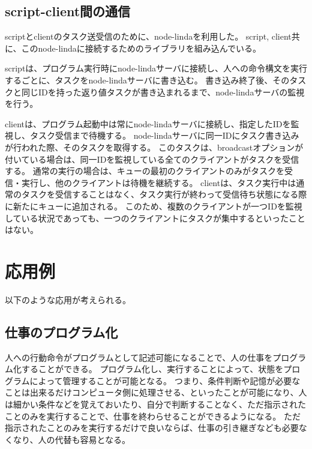 \subsection{script-client間の通信}\label{script-clientux9593ux306eux901aux4fe1}

scriptとclientのタスク送受信のために、node-linda\cite{linda}を利用した。
script,
client共に、このnode-lindaに接続するためのライブラリを組み込んでいる。

scriptは、プログラム実行時にnode-lindaサーバに接続し、人への命令構文を実行するごとに、タスクをnode-lindaサーバに書き込む。
書き込み終了後、そのタスクと同じIDを持った返り値タスクが書き込まれるまで、node-lindaサーバの監視を行う。

clientは、プログラム起動中は常にnode-lindaサーバに接続し、指定したIDを監視し、タスク受信まで待機する。
node-lindaサーバに同一IDにタスク書き込みが行われた際、そのタスクを取得する。
このタスクは、broadcastオプションが付いている場合は、同一IDを監視している全てのクライアントがタスクを受信する。
通常の実行の場合は、キューの最初のクライアントのみがタスクを受信・実行し、他のクライアントは待機を継続する。
clientは、タスク実行中は通常のタスクを受信することはなく、タスク実行が終わって受信待ち状態になる際に新たにキューに追加される。
このため、複数のクライアントが一つIDを監視している状況であっても、一つのクライアントにタスクが集中するといったことはない。

\section{応用例}\label{ux5fdcux7528ux4f8b}

以下のような応用が考えられる。

\subsection{仕事のプログラム化}\label{ux4ed5ux4e8bux306eux30d7ux30edux30b0ux30e9ux30e0ux5316}

人への行動命令がプログラムとして記述可能になることで、人の仕事をプログラム化することができる。
プログラム化し、実行することによって、状態をプログラムによって管理することが可能となる。
つまり、条件判断や記憶が必要なことは出来るだけコンピュータ側に処理させる、といったことが可能になり、人は細かい条件などを覚えておいたり、自分で判断することなく、ただ指示されたことのみを実行することで、仕事を終わらせることができるようになる。
ただ指示されたことのみを実行するだけで良いならば、仕事の引き継ぎなども必要なくなり、人の代替も容易となる。

